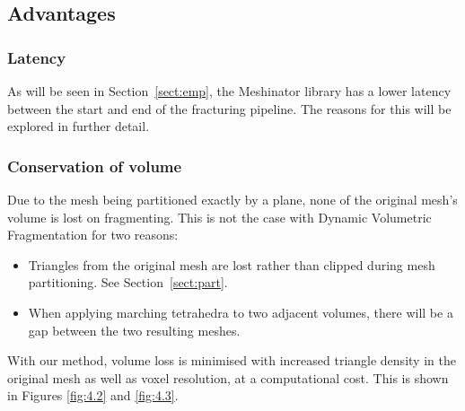 \subsection{Advantages}

\subsubsection{Latency}

As will be seen in Section~\ref{sect:emp}, the Meshinator library has a lower latency between the start and end of the fracturing pipeline. The reasons for this will be explored in further detail.

\subsubsection{Conservation of volume}

Due to the mesh being partitioned exactly by a plane, none of the original mesh's volume is lost on fragmenting. This is not the case with Dynamic Volumetric Fragmentation for two reasons:

\begin{itemize}
\item{Triangles from the original mesh are lost rather than clipped during mesh partitioning. See Section~\ref{sect:part}.}
\item{When applying marching tetrahedra to two adjacent volumes, there will be a gap between the two resulting meshes.}
\end{itemize}

With our method, volume loss is minimised with increased triangle density in the original mesh as well as voxel resolution, at a computational cost. This is shown in Figures \ref{fig:4.2} and \ref{fig:4.3}.

